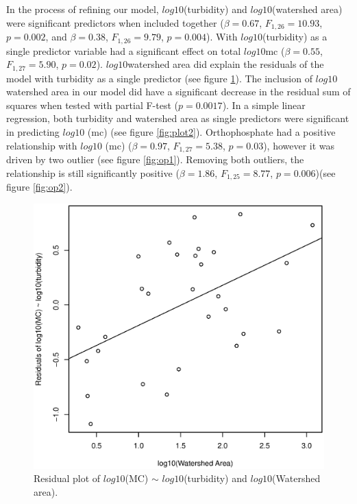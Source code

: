 In the process of refining our model, $log10$(turbidity) and $log10$(watershed area) were significant predictors when included together ($\beta=0.67$, $F_{{1,26}}=10.93$, $p=0.002$, and $\beta=0.38$, $F_{{1,26}}=9.79$, $p=0.004$). With $log10$(turbidity) as a single predictor variable had a significant effect on total $log10$\gls{mc} ($\beta=0.55$, $F_{{1,27}}=5.90$, $p=0.02$).  $log10$watershed area did explain the residuals of the model with turbidity as a single predictor (see figure \ref{fig:residuals}). The inclusion of $log10$watershed area in our model did have a significant decrease in the residual sum of squares when tested with partial F-test ($p=0.0017$). In a simple linear regression, both turbidity and watershed area as single predictors were significant in predicting $log10$ (\gls{mc}) (see figure \ref{fig:plot2}). Orthophosphate had a positive relationship with $log10$ (\gls{mc}) ($\beta=0.97$, $F_{{1,27}}=5.38$, $p=0.03$), however it was driven by two outlier (see figure \ref{fig:op1}). Removing both outliers, the relationship is still significantly positive ($\beta=1.86$, $F_{{1,25}}=8.77$, $p=0.006$)(see figure \ref{fig:op2}).

\begin{figure}
	\includegraphics[width=\textwidth]{figures/residual}
	\caption{Residual plot of $log10$(MC) $\sim$ $log10$(turbidity) and $log10$(Watershed area).}
	\label{fig:residuals}
\end{figure}

